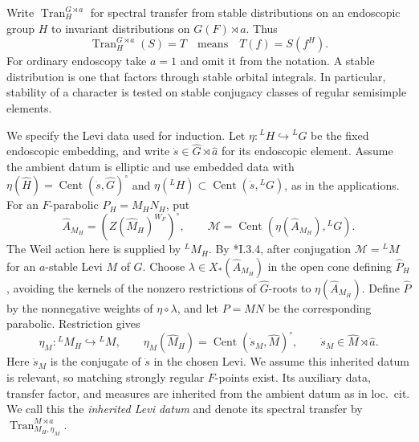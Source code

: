 \documentclass[12pt]{amsart}
\theoremstyle{definition}
\theoremstyle{plain}
\theoremstyle{remark}
\DeclareMathOperator{\Cent}{Cent}%
\numberwithin{equation}{section}
\begin{document}
Write $\operatorname{Tran}_H^{G \rtimes a}$ for spectral transfer from
stable distributions on an endoscopic group $H$ to invariant distributions
on $G(F) \rtimes a$. Thus
\[
 \operatorname{Tran}_H^{G \rtimes a}(S)=T
 \quad\text{means}\quad T(f)=S(f^H).
\]
For ordinary endoscopy take $a=1$ and omit it from the
notation. A stable distribution is one that factors through stable
orbital integrals. In particular, stability of a character is tested
on stable conjugacy classes of regular semisimple elements.



We specify the Levi data used for induction. Let
$\eta:{}^LH\hookrightarrow{}^LG$ be the fixed endoscopic embedding,
and write $\dot s\in\widehat G\rtimes\widehat a$ for its
endoscopic element. Assume the ambient datum is elliptic and use
embedded data with
$\eta(\widehat H)=\Cent(\dot s,\widehat G)^\circ$ and
$\eta({}^LH)\subset\Cent(\dot s,{}^LG)$, as in the applications.
For an $F$-parabolic $P_H=M_HN_H$, put
\[
 \widehat A_{M_H}=(Z(\widehat M_H)^{W_F})^\circ,
 \qquad \mathcal M=\Cent(\eta(\widehat A_{M_H}),{}^LG).
\]
The Weil action here is supplied by ${}^LM_H$.
By \cite{MoeglinWaldspurger2016-StabilisationFormuleTracesTordue1}*{I.3.4},
after conjugation $\mathcal M={}^LM$ for an $a$-stable Levi
$M$ of $G$. Choose $\lambda\in X_*(\widehat A_{M_H})$ in the open
cone defining $\widehat P_H$, avoiding the kernels of the nonzero
restrictions of $\widehat G$-roots to $\eta(\widehat A_{M_H})$.
Define $\widehat P$ by the nonnegative weights of $\eta\circ\lambda$,
and let $P=MN$ be the corresponding parabolic. Restriction gives
\[
 \eta_M:{}^LM_H\hookrightarrow{}^LM,
 \qquad
 \eta_M(\widehat M_H)=\Cent(\dot s_M,\widehat M)^\circ,
 \qquad \dot s_M\in\widehat M\rtimes\widehat a.
\]
Here $\dot s_M$ is the conjugate of $\dot s$ in the chosen Levi.
We assume this inherited datum is relevant, so matching strongly
regular $F$-points exist. Its auxiliary data, transfer factor, and
measures are inherited from the ambient datum as in loc.~cit.
We call this the \emph{inherited Levi datum} and denote its spectral
transfer by $\operatorname{Tran}_{M_H,\eta_M}^{M \rtimes a}$.
\end{document}
